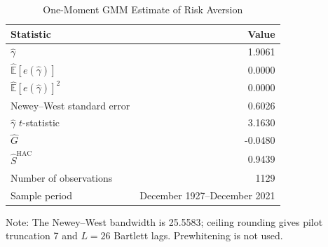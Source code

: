 \begin{table}[H]
  \centering
  \caption{One-Moment GMM Estimate of Risk Aversion}
  \label{tab:3b-gmm}
  \begin{tabular}{lr}
    \toprule
    Statistic & Value \\
    \midrule
    $\hat{\gamma}$ & 1.9061 \\
    $\widehat{\mathbb{E}}[e(\hat{\gamma})]$ & 0.0000 \\
    $\widehat{\mathbb{E}}[e(\hat{\gamma})]^2$ & 0.0000 \\
    Newey--West standard error & 0.6026 \\
    $\hat{\gamma}$ $t$-statistic & 3.1630 \\
    $\hat{G}$ & -0.0480 \\
    $\hat{S}^{\mathrm{HAC}}$ & 0.9439 \\
    Number of observations & 1129 \\
    Sample period & December 1927--December 2021 \\
    \bottomrule
  \end{tabular}
  \footnotesize{Note: The Newey--West bandwidth is 25.5583; ceiling rounding gives pilot truncation 7 and $L=26$ Bartlett lags. Prewhitening is not used.}
\end{table}

